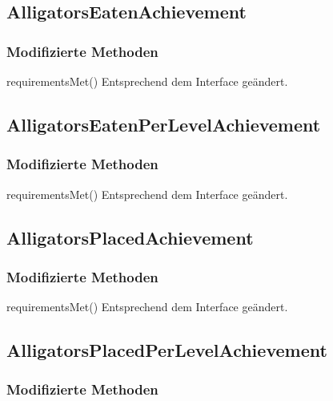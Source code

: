 \subsection{AlligatorsEatenAchievement}

\subsubsection{Modifizierte Methoden}

\begin{description}
	\item{requirementsMet()}
	Entsprechend dem Interface geändert.
\end{description}

\subsection{AlligatorsEatenPerLevelAchievement}

\subsubsection{Modifizierte Methoden}

\begin{description}
	\item{requirementsMet()}
	Entsprechend dem Interface geändert.
\end{description}

\subsection{AlligatorsPlacedAchievement}

\subsubsection{Modifizierte Methoden}

\begin{description}
	\item{requirementsMet()}
	Entsprechend dem Interface geändert.
\end{description}

\subsection{AlligatorsPlacedPerLevelAchievement}

\subsubsection{Modifizierte Methoden}

